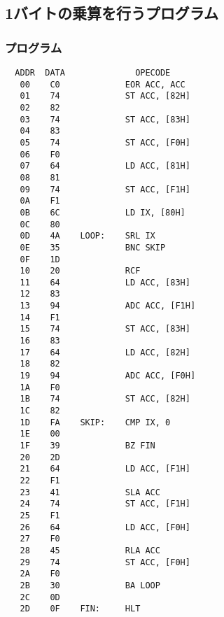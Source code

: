 \documentclass[titlepage]{jsarticle}
\theoremstyle{definition}
\begin{document}
\subsection{1バイトの乗算を行うプログラム}

\subsubsection{プログラム}

\begin{lstlisting}
  ADDR  DATA              OPECODE
   00    C0             EOR ACC, ACC
   01    74             ST ACC, [82H]
   02    82
   03    74             ST ACC, [83H]
   04    83
   05    74             ST ACC, [F0H]
   06    F0
   07    64             LD ACC, [81H]
   08    81
   09    74             ST ACC, [F1H]
   0A    F1
   0B    6C             LD IX, [80H]
   0C    80
   0D    4A    LOOP:    SRL IX
   0E    35             BNC SKIP
   0F    1D
   10    20             RCF
   11    64             LD ACC, [83H]
   12    83
   13    94             ADC ACC, [F1H]
   14    F1
   15    74             ST ACC, [83H]
   16    83
   17    64             LD ACC, [82H]
   18    82
   19    94             ADC ACC, [F0H]
   1A    F0
   1B    74             ST ACC, [82H]
   1C    82
   1D    FA    SKIP:    CMP IX, 0
   1E    00
   1F    39             BZ FIN
   20    2D
   21    64             LD ACC, [F1H]
   22    F1
   23    41             SLA ACC
   24    74             ST ACC, [F1H]
   25    F1
   26    64             LD ACC, [F0H]
   27    F0
   28    45             RLA ACC
   29    74             ST ACC, [F0H]
   2A    F0
   2B    30             BA LOOP
   2C    0D
   2D    0F    FIN:     HLT
\end{lstlisting}
\end{document}
